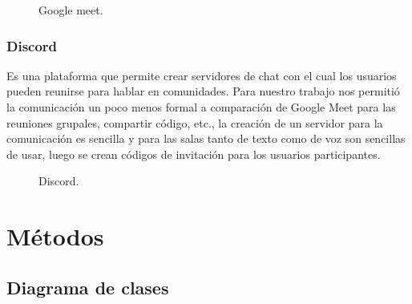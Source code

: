 \documentclass[conference]{IEEEtran}
\begin{document}
        \begin{figure}[ht]
            \caption{Google meet.}
            \label{figiconqt}
        \end{figure}
        
        \subsubsection{Discord} 
        Es una plataforma que permite crear servidores de chat con el cual los usuarios pueden reunirse para hablar en comunidades. Para nuestro trabajo nos permitió la comunicación un poco menos formal a comparación de Google Meet para las reuniones grupales, compartir código, etc., la creación de un servidor para la comunicación es sencilla y para las salas tanto de texto como de voz son sencillas de usar, luego se crean códigos de invitación para los usuarios participantes.
            
         \begin{figure}[ht]
            \caption{Discord.}
            \label{figimeet}
        \end{figure}   
        

\section{Métodos}

    \subsection{Diagrama de clases}
    
\end{document}
